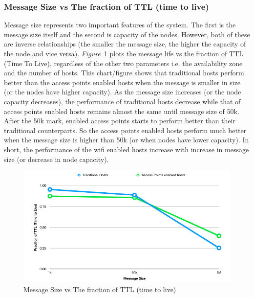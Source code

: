 \subsubsection{Message Size vs The fraction of TTL (time to live)}
Message size represents two important features of the system. The first is the message size itself and the second is capacity of the nodes. However, both of these are inverse relationships (the smaller the message size, the higher the capacity of the node and vice versa). \emph{Figure}~\ref{fig:scenario1_message_size} plots the message life vs the fraction of TTL (Time To Live), regardless of the other two parameters i.e. the availability zone and the number of hosts. This chart/figure shows that traditional hosts perform better than the access points enabled hosts when the message is smaller in size (or the nodes have higher capacity). As the message size increases (or the node capacity decreases), the performance of traditional hosts decrease while that of access points enabled hosts remains almost the same until message size of 50k. After the 50k mark, enabled access points starts to perform better than their traditional counterparts. So the access points enabled hosts perform much better when the message size is higher than 50k (or when nodes have lower capacity). In short, the performance of the wifi enabled hosts increase with increase in message size (or decrease in node capacity).

\begin{figure}[h]
  \centering
  \includegraphics[scale=0.5]{./figures/scenario1_message_size}
  \caption{Message Size vs The fraction of TTL (time to live)}
  \label{fig:scenario1_message_size}
\end{figure}
